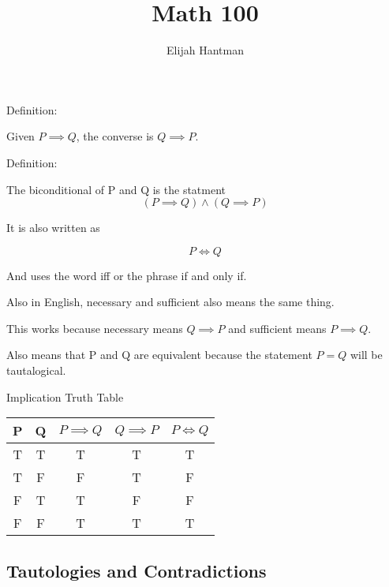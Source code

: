 \documentclass{report}
\title{\Huge{Math 100}}
\author{\huge{Elijah Hantman}}
\date{}
\begin{document}
\maketitle
\newpage

Definition:
\begin{mdframed}
    Given $P \implies Q$, the converse
    is $Q \implies P$.
\end{mdframed}

Definition:
\begin{mdframed}
    The biconditional of P and Q is the statment
    \begin{displaymath}
        (P \implies Q) \land (Q \implies P)
    \end{displaymath}

    It is also written as

    \begin{displaymath}
        P \iff Q
    \end{displaymath}

    And uses the word iff or the phrase
    if and only if.

    Also in English, necessary and sufficient
    also means the same thing.

    This works because necessary means $Q \implies P$
    and sufficient means $P \implies Q$.

    Also means that P and Q are equivalent because
    the statement $P = Q$ will be tautalogical.
\end{mdframed}

\begin{center}
    Implication Truth Table\\
    \begin{tabular}{|c|c|c|c|c|}
        \hline
        P & Q & $P \implies Q$ & $Q \implies P$ & $P \iff Q$\\ 
        \hline
        T & T & T & T & T\\
        \hline
        T & F & F & T & F\\
        \hline
        F & T & T & F & F\\
        \hline
        F & F & T & T & T\\
        \hline
    \end{tabular}
\end{center}

\subsection{Tautologies and Contradictions}
\end{document}
